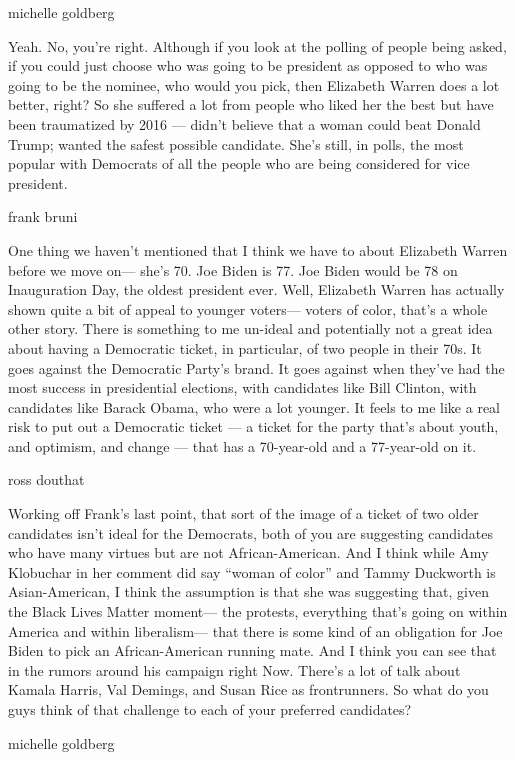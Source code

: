 michelle goldberg

Yeah. No, you're right. Although if you look at the polling of people
being asked, if you could just choose who was going to be president as
opposed to who was going to be the nominee, who would you pick, then
Elizabeth Warren does a lot better, right? So she suffered a lot from
people who liked her the best but have been traumatized by 2016 ---
didn't believe that a woman could beat Donald Trump; wanted the safest
possible candidate. She's still, in polls, the most popular with
Democrats of all the people who are being considered for vice president.

frank bruni

One thing we haven't mentioned that I think we have to about Elizabeth
Warren before we move on--- she's 70. Joe Biden is 77. Joe Biden would
be 78 on Inauguration Day, the oldest president ever. Well, Elizabeth
Warren has actually shown quite a bit of appeal to younger voters---
voters of color, that's a whole other story. There is something to me
un-ideal and potentially not a great idea about having a Democratic
ticket, in particular, of two people in their 70s. It goes against the
Democratic Party's brand. It goes against when they've had the most
success in presidential elections, with candidates like Bill Clinton,
with candidates like Barack Obama, who were a lot younger. It feels to
me like a real risk to put out a Democratic ticket --- a ticket for the
party that's about youth, and optimism, and change --- that has a
70-year-old and a 77-year-old on it.

ross douthat

Working off Frank's last point, that sort of the image of a ticket of
two older candidates isn't ideal for the Democrats, both of you are
suggesting candidates who have many virtues but are not
African-American. And I think while Amy Klobuchar in her comment did say
``woman of color'' and Tammy Duckworth is Asian-American, I think the
assumption is that she was suggesting that, given the Black Lives Matter
moment--- the protests, everything that's going on within America and
within liberalism--- that there is some kind of an obligation for Joe
Biden to pick an African-American running mate. And I think you can see
that in the rumors around his campaign right Now. There's a lot of talk
about Kamala Harris, Val Demings, and Susan Rice as frontrunners. So
what do you guys think of that challenge to each of your preferred
candidates?

michelle goldberg

